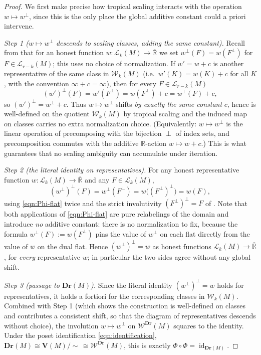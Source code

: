 \documentclass{article}
\theoremstyle{definition}
\newcommand{\Rbar}{\overline{\mathbb{R}}}
\newcommand{\R}{\mathbb{R}}
\newcommand{\Dr}{\mathbf{Dr}}
\newcommand{\bV}{\mathbf V}
\newcommand{\cLL}{\mathcal{L}}
\newcommand{\cW}{\mathcal{W}}
\begin{document}
\begin{proof}
We first make precise how tropical scaling interacts with the operation $w\mapsto w^{\perp}$, since
this is the only place the global additive constant could a priori intervene.

\smallskip
\noindent\emph{Step 1 ($w\mapsto w^{\perp}$ descends to scaling classes, adding the same constant).}
Recall from  that for an honest function $w\colon\cLL_k(M)\to\Rbar$ we set
$w^{\perp}(F)=w(F^{\perp})$ for $F\in\cLL_{r-k}(M)$; this uses no choice of normalization. If
$w'=w+c$ is another representative of the same class in $\cW_k(M)$ (i.e.\ $w'(K)=w(K)+c$ for all $K$,
with the convention $\infty+c=\infty$), then for every $F\in\cLL_{r-k}(M)$
\[
  (w')^{\perp}(F)=w'(F^{\perp})=w(F^{\perp})+c=w^{\perp}(F)+c,
\]
so $(w')^{\perp}=w^{\perp}+c$. Thus $w\mapsto w^{\perp}$ shifts \emph{by exactly the same constant}
$c$, hence is well-defined on the quotient $\cW_k(M)$ by tropical scaling and the induced map on
classes carries no extra normalization choice. (Equivalently: $w\mapsto w^{\perp}$ is the linear
operation of precomposing with the bijection $\perp$ of index sets, and precomposition commutes with
the additive $\R$-action $w\mapsto w+c$.) This is what guarantees that no scaling ambiguity can
accumulate under iteration.

\smallskip
\noindent\emph{Step 2 (the literal identity on representatives).}
For any honest representative function $w\colon\cLL_k(M)\to\Rbar$ and any $F\in\cLL_k(M)$,
\[
  (w^{\perp})^{\perp}(F)=w^{\perp}(F^{\perp})=w\bigl((F^{\perp})^{\perp}\bigr)=w(F),
\]
using \eqref{eqn:Phi-flat} twice and the strict involutivity $(F^{\perp})^{\perp}=F$ of
. Note that both applications of \eqref{eqn:Phi-flat} are pure relabelings of the
domain and introduce \emph{no} additive constant: there is no normalization to fix, because the
formula $w^{\perp}(F):=w(F^{\perp})$ pins the value of $w^{\perp}$ on each flat directly from the
value of $w$ on the dual flat. Hence $(w^{\perp})^{\perp}=w$ as honest functions
$\cLL_k(M)\to\Rbar$, for \emph{every} representative $w$; in particular the two sides agree without
any global shift.

\smallskip
\noindent\emph{Step 3 (passage to $\Dr(M)$).}
Since the literal identity $(w^{\perp})^{\perp}=w$ holds for representatives, it holds a fortiori for
the corresponding classes in $\cW_k(M)$. Combined with Step 1 (which shows the construction is
well-defined on classes and contributes a consistent shift, so that the diagram of representatives
descends without choice), the involution $w\mapsto w^{\perp}$ on $\cW^{\Dr}(M)$ squares to the
identity. Under the poset identification \eqref{eqn:identification},
$\Dr(M)\cong\bV(M)/\!\sim\,\cong\cW^{\Dr}(M)$, this is exactly $\Phi\circ\Phi=\operatorname{id}_{
\Dr(M)}$.


\end{proof}
\end{document}
